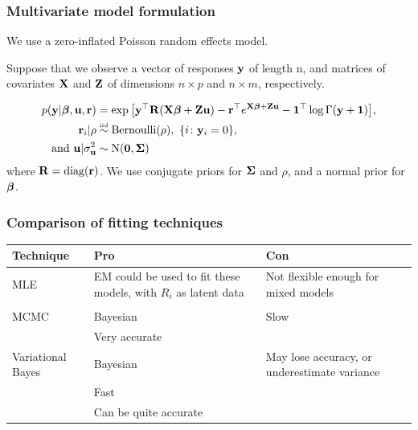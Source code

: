 \documentclass{beamer}
\begin{document}
\begin{frame}
	\frametitle{Multivariate model formulation}
	We use a zero-inflated Poisson random effects model.
							
	\medskip
							
	Suppose that we observe a vector of responses ${\bf y}$ of length n, and matrices
	of covariates ${\bf X}$ and ${\bf Z}$ of dimensions $n \times p$ and $n \times m$,
	respectively.
							
	\begin{align*}
		p({\bf y}|{\boldsymbol \beta}, {\bf u}, {\bf r})       & = \exp{\left[{\bf y}^\top {\bf R}({\bf X}{\boldsymbol\beta}+ {\bf Z}{\bf u}) - {\bf r}^\top e^{{\bf X}{\boldsymbol\beta}+ {\bf Z}{\bf u}} - {\bf1}^\top \log{\Gamma({\bf y}+ {\bf1})}\right]}, \\
		{\bf r}_i|\rho                    & \stackrel{\mbox{\tiny iid}}{\sim} \text{Bernoulli}(\rho), \ \{i \colon {\bf y}_i=0\},                                                   \\
		\text{and }{\bf u}|\sigma_{{\bf u}}^2 & \sim \text{N}({\bf 0}, {\boldsymbol \Sigma})
	\end{align*}
	\noindent where ${\bf R} =\mbox{diag}({\bf r})$.
	We use conjugate priors for ${\boldsymbol \Sigma}$ and $\rho$, and a normal prior for ${\boldsymbol \beta}$.
\end{frame}


\begin{frame}
	\frametitle{Comparison of fitting techniques}
	\begin{tabular}{p{2cm}p{3.5cm}p{4.5cm}}
		Technique         & Pro                                                             & Con                                                 \\
		\hline
		MLE               & EM could be used to fit these models, with $R_i$ as latent data & Not flexible enough for mixed models               \\
		                  &                                                                 &                                                     \\ %
		\hline
		MCMC              & Bayesian                                                        & Slow                                                \\
		                  & Very accurate                                                   &                                                     \\
		\hline
		Variational Bayes & Bayesian                                                        & May lose accuracy, or \mbox{underestimate} variance \\
		                  & Fast                                                            &                                                     \\ %
		                  & Can be quite \mbox{accurate}                                    &                                                     \\
		\hline
	\end{tabular}
							
\end{frame}
\end{document}
